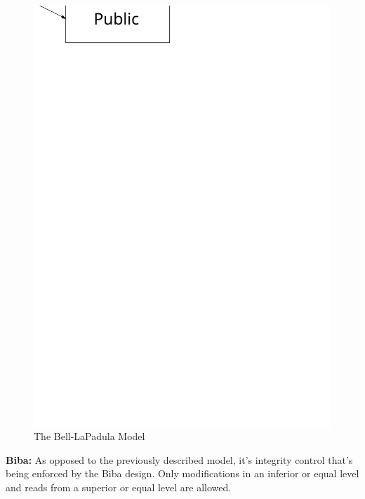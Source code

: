 \documentclass[pdftex,a4paper,titlepage,11pt]{article}
\begin{document}
\begin{figure}[h]
	\centering
	\includegraphics[scale=0.5]{bell-lp}
	\caption{The Bell-LaPadula Model}
\end{figure}

\bigskip

\textbf{Biba:} As opposed to the previously described model, it's integrity control that's being enforced by the Biba design. Only modifications in an inferior or equal level and reads from a superior or equal level are allowed.
\end{document}
